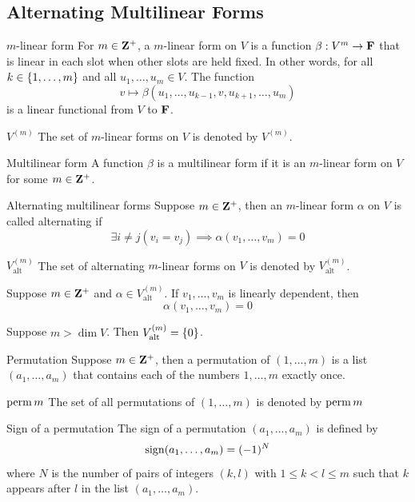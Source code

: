 \documentclass[12pt,a4paper]{article}
\begin{document}
    \subsection{Alternating Multilinear Forms}
    \begin{defi}{$m$-linear form}
        For $m\in\mathbf{Z}^+$, a $m$-linear form on $V$ is a function $\beta:V^m\to\mathbf{F}$ that is linear in each slot when other slots are held fixed. In other words, for all $k\in\left\{1,\dots,m\right\}$ and all $u_1,\dots,u_m\in V$. The function
        $$
        v\mapsto\beta(u_1,\dots,u_{k-1},v,u_{k+1},\dots,u_m)
        $$
        is a linear functional from $V$ to $\mathbf{F}$.
    \end{defi}
    \begin{notation}{$V^{(m)}$}
        The set of $m$-linear forms on $V$ is denoted by $V^{(m)}$.
    \end{notation}
    \begin{defi}{Multilinear form}
        A function $\beta$ is a multilinear form if it is an $m$-linear form on $V$ for some $m\in\mathbf{Z}^+$.
    \end{defi}
    \begin{defi}{Alternating multilinear forms}\label{9.23}
        Suppose $m\in\mathbf{Z}^+$, then an $m$-linear form $\alpha$ on $V$ is called alternating if
        $$
        \exists i\neq j(v_i=v_j)\implies\alpha(v_1,\dots,v_m)=0
        $$
    \end{defi}
    \begin{notation}{$V_{\mathrm{alt}}^{(m)}$}
        The set of alternating $m$-linear forms on $V$ is denoted by $V_{\mathrm{alt}}^{(m)}$.
    \end{notation}
    \hfill

    \begin{prop}
        Suppose $m\in\mathbf{Z}^+$ and $\alpha\in V_{\mathrm{alt}}^{(m)}$. If $v_1,\dots,v_m$ is linearly dependent, then
        $$
        \alpha(v_1,\dots,v_m)=0
        $$
    \end{prop}
    \begin{cor}
        Suppose $m>\dim V$. Then $V_{\mathrm{alt}}^{(m)}=\left\{0\right\}$.
    \end{cor}
    \hfill

    \begin{defi}{Permutation}
        Suppose $m\in\mathbf{Z}^+$, then a permutation of $(1,\dots,m)$ is a list $(a_1,\dots,a_m)$ that contains each of the numbers $1,\dots,m$ exactly once.
    \end{defi}
    \begin{notation}{$\operatorname{perm} m$}
        The set of all permutations of $(1,\dots,m)$ is denoted by $\operatorname{perm} m$
    \end{notation}
    \begin{defi}{Sign of a permutation}
        The sign of a permutation $(a_1,\dots,a_m)$ is defined by
        $$
        \operatorname{sign}(a_1,\dots,a_m)=(-1)^N
        $$
        where $N$ is the number of pairs of integers $(k,l)$ with $1\leq k<l\leq m$ such that $k$ appears after $l$ in the list $(a_1,\dots,a_m)$.
    \end{defi}
    \hfill
\end{document}
